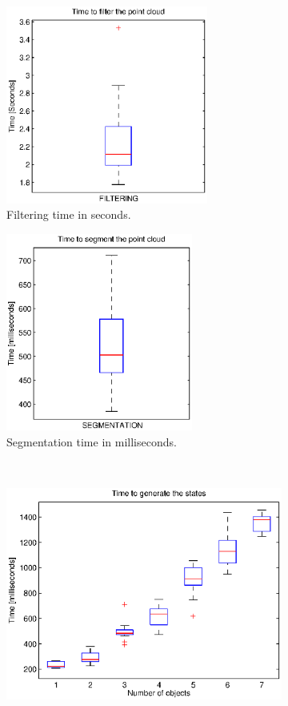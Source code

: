 \begin{figure}[tb]
\centering
\begin{subfigure}[t]{0.4\textwidth}
\centering
\includegraphics[height=6.5cm]{Img/experiments/exp_good/data/filtering.eps}
\caption{Filtering time in seconds.}
\end{subfigure}
\begin{subfigure}[t]{0.4\textwidth}
\centering
\includegraphics[height=6.5cm]{Img/experiments/exp_good/data/segmentation.eps}
\caption{Segmentation time in milliseconds.}
\end{subfigure}
\\
\begin{subfigure}[t]{0.45\textwidth}
\centering
\includegraphics[width=\textwidth]{Img/experiments/exp_good/data/predicates.eps}

\end{subfigure}
\end{figure}
